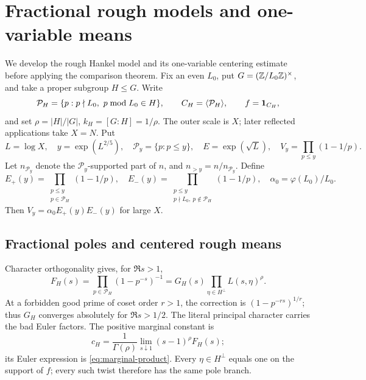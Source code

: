 \section{Fractional rough models and one-variable means}\label{sec:model-preparation}
We develop the rough Hankel model and its one-variable centering
estimate before applying the comparison theorem. Fix an even
\(L_0\), put \(G=(\mathbb Z/L_0\mathbb Z)^\times\), and take a proper subgroup
\(H\le G\). Write
\[
 \mathcal P_H=\{p:p\nmid L_0,\ p\bmod L_0\in H\},\qquad
 C_H=\langle\mathcal P_H\rangle,\qquad f=\mathbf 1_{C_H},
\]
and set \(\rho=|H|/|G|\), \(k_H=[G:H]=1/\rho\). The outer
scale is \(X\); later reflected applications take \(X=N\).
Put
\[
 L=\log X,\quad y=\exp(L^{2/5}),\quad \mathcal P_y=\{p:p\le y\},\quad
 E=\exp(\sqrt L),\quad V_y=\prod_{p\le y}(1-1/p).
\]
Let \(n_{\mathcal P_y}\) denote the \(\mathcal P_y\)-supported part of \(n\), and
\(n_{>y}=n/n_{\mathcal P_y}\). Define
\[
 E_+(y)=\prod_{\substack{p\le y\\p\in\mathcal P_H}}(1-1/p),\quad
 E_-(y)=\prod_{\substack{p\le y\\p\nmid L_0,\ p\notin\mathcal P_H}}(1-1/p),
 \quad \alpha_0=\varphi(L_0)/L_0.
\]
Then \(V_y=\alpha_0E_+(y)E_-(y)\) for large \(X\).

\subsection{Fractional poles and centered rough means}
Character orthogonality gives, for \(\Re s>1\),
\begin{equation}\label{eq:euler-branches}
 F_H(s)=\prod_{p\in\mathcal P_H}(1-p^{-s})^{-1}
       =G_H(s)\prod_{\eta\in H^\perp}L(s,\eta)^\rho.
\end{equation}
At a forbidden good prime of coset order \(r>1\), the correction
is \((1-p^{-rs})^{1/r}\); thus \(G_H\) converges absolutely for
\(\Re s>1/2\). The literal principal character carries the bad Euler factors.
The positive marginal constant is
\[
 c_H=\frac1{\Gamma(\rho)}
             \lim_{s\downarrow1}(s-1)^\rho F_H(s);
\]
its Euler expression is \eqref{eq:marginal-product}. Every
\(\eta\in H^\perp\) equals one on the support of \(f\); every such
twist therefore has the same pole branch.

